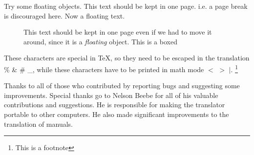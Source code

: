 \par
Try some floating objects.
\nwl
{\nobreak
This text should be kept in one page. i.e. a page break is discouraged here.
}
\nwl
Now a floating text.
\begin{figure}
This text should be kept in one page even if we had to move it around,
since it is a
{\it floating}
object. This is a boxed
\end{figure}
\nwl
These characters are special in TeX, so they need to be escaped
in the translation \% \& \# \_, while these characters have to be
printed in math mode $<$ $>$ $|$. 
\footnote{
This is a footnote
}
\par
\ACK
Thanks to all of those who contributed by reporting bugs and suggesting
some improvements. Special thanks go to Nelson Beebe for all of his valuable
contributions and suggestions. He is responsible for making the translator
portable to other computers. He also made significant improvements to
the translation of manuals.
\REF
{}

